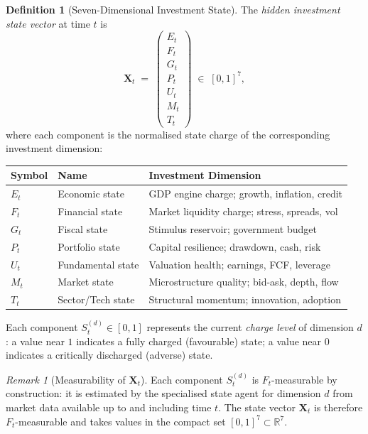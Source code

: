 \documentclass[12pt,openany]{book}
\newcommand{\calE}{\mathcal{E}}
\newcommand{\calF}{\mathcal{F}}
\newcommand{\calG}{\mathcal{G}}
\newcommand{\calP}{\mathcal{P}}
\newcommand{\calU}{\mathcal{U}}
\newcommand{\calM}{\mathcal{M}}
\newcommand{\calT}{\mathcal{T}}
\numberwithin{equation}{chapter}
\theoremstyle{plain}
\theoremstyle{definition}
\newtheorem{definition}[theorem]{Definition}
\theoremstyle{remark}
\newtheorem{remark}[theorem]{Remark}
\def\mathcal#1{#1}%
\begin{document}
\begin{definition}[Seven-Dimensional Investment State]
\label{def:hidden-state}
The \emph{hidden investment state vector} at time $t$ is
\begin{equation}
  \mathbf{X}_t \;=\; \begin{pmatrix}
    \calE_t \\ \calF_t \\ \calG_t \\ \calP_t \\
    \calU_t \\ \calM_t \\ \calT_t
  \end{pmatrix} \;\in\; [0,1]^7,
  \label{eq:hidden-state}
\end{equation}
where each component is the normalised state charge of the
corresponding investment dimension:

\begin{center}
\begin{tabularx}{\textwidth}{@{} l l X @{}}
\toprule
\textbf{Symbol} & \textbf{Name} & \textbf{Investment Dimension} \\
\midrule
$\calE_t$ & Economic state & GDP engine charge; growth, inflation, credit \\
$\calF_t$ & Financial state & Market liquidity charge; stress, spreads, vol \\
$\calG_t$ & Fiscal state & Stimulus reservoir; government budget \\
$\calP_t$ & Portfolio state & Capital resilience; drawdown, cash, risk \\
$\calU_t$ & Fundamental state & Valuation health; earnings, FCF, leverage \\
$\calM_t$ & Market state & Microstructure quality; bid-ask, depth, flow \\
$\calT_t$ & Sector/Tech state & Structural momentum; innovation, adoption \\
\bottomrule
\end{tabularx}
\end{center}

Each component $\mathcal{S}_t^{(d)} \in [0,1]$ represents the
current \emph{charge level} of dimension $d$: a value near $1$
indicates a fully charged (favourable) state; a value near $0$
indicates a critically discharged (adverse) state.
\end{definition}

\begin{remark}[Measurability of $\mathbf{X}_t$]
\label{rem:state-measurable}
Each component $\mathcal{S}_t^{(d)}$ is $\calF_t$-measurable
by construction: it is estimated by the specialised state agent
for dimension $d$ from market data available up to and including
time $t$.  The state vector $\mathbf{X}_t$ is therefore
$\calF_t$-measurable and takes values in the compact set
$[0,1]^7 \subset \mathbb{R}^7$.
\end{remark}
\end{document}
